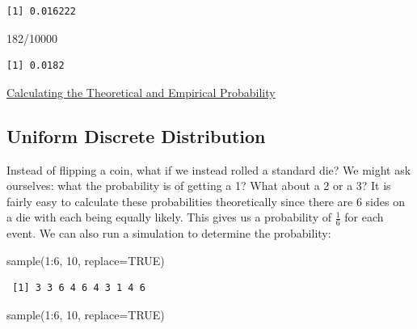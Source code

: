 \documentclass[
  letterpaper,
  DIV=11,
  numbers=noendperiod]{scrreprt}
\newenvironment{Shaded}{\begin{snugshade}}{\end{snugshade}}
\newcommand{\AttributeTok}[1]{\textcolor[rgb]{0.40,0.45,0.13}{#1}}
\newcommand{\ConstantTok}[1]{\textcolor[rgb]{0.56,0.35,0.01}{#1}}
\newcommand{\DecValTok}[1]{\textcolor[rgb]{0.68,0.00,0.00}{#1}}
\newcommand{\FunctionTok}[1]{\textcolor[rgb]{0.28,0.35,0.67}{#1}}
\newcommand{\NormalTok}[1]{\textcolor[rgb]{0.00,0.23,0.31}{#1}}
\newcommand{\SpecialCharTok}[1]{\textcolor[rgb]{0.37,0.37,0.37}{#1}}
\begin{document}
\begin{verbatim}
[1] 0.016222
\end{verbatim}

\begin{Shaded}
\begin{Highlighting}[]
\DecValTok{182}\SpecialCharTok{/}\DecValTok{10000}
\end{Highlighting}
\end{Shaded}

\begin{verbatim}
[1] 0.0182
\end{verbatim}

\begin{watch}{}{}
    \href{https://youtu.be/SDBW7QNa6HA}{Calculating the Theoretical and Empirical Probability}
\end{watch}

\subsection{Uniform Discrete
Distribution}\label{uniform-discrete-distribution}

Instead of flipping a coin, what if we instead rolled a standard die? We
might ask ourselves: what the probability is of getting a 1? What about
a 2 or a 3? It is fairly easy to calculate these probabilities
theoretically since there are 6 sides on a die with each being equally
likely. This gives us a probability of \(\frac{1}{6}\) for each event.
We can also run a simulation to determine the probability:

\begin{Shaded}
\begin{Highlighting}[]
\FunctionTok{sample}\NormalTok{(}\DecValTok{1}\SpecialCharTok{:}\DecValTok{6}\NormalTok{, }\DecValTok{10}\NormalTok{, }\AttributeTok{replace=}\ConstantTok{TRUE}\NormalTok{)}
\end{Highlighting}
\end{Shaded}

\begin{verbatim}
 [1] 3 3 6 4 6 4 3 1 4 6
\end{verbatim}

\begin{Shaded}
\begin{Highlighting}[]
\FunctionTok{sample}\NormalTok{(}\DecValTok{1}\SpecialCharTok{:}\DecValTok{6}\NormalTok{, }\DecValTok{10}\NormalTok{, }\AttributeTok{replace=}\ConstantTok{TRUE}\NormalTok{)}
\end{Highlighting}
\end{Shaded}
\end{document}
